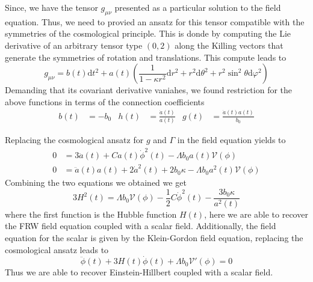 \documentclass[10pt,a4paper]{article}
\begin{document}
Since, we have the tensor $g_{\mu\nu}$ presented as a particular solution to the field equation. Thus, we need to provied
an ansatz for this tensor compatible with the symmetries of the cosmological principle. This is donde by computing the Lie derivative of an 
arbitrary tensor type $(0,2)$ along the Killing vectors that generate the symmetries of rotation and translations. This compute leads to 
\begin{equation}
  g_{\mu\nu} = b(t)\mathrm{d}t^2 + a(t)\left(\frac{1}{1 - \kappa r^2} \mathrm{d}r^2 + r^2 \mathrm{d}\theta^2 
  + r^2 \sin^2 \theta \mathrm{d} \varphi^2 \right)
\end{equation}
Demanding that its covariant derivative vaniahes, we found restriction for the above functions in terms of the connection coefficients
\begin{align}
  b(t) & = -b_0 & h(t) & = \frac{\dot{a}(t)}{a(t)} & g(t) & = \frac{\dot{a}(t)a(t)}{b_0}
\end{align}

Replacing the cosmological ansatz for $g$ and $\Gamma$ in the field equation yields to
\begin{align}
  0 & = 3\ddot{a}(t) + C a(t)\dot{\phi}^{2}(t) - \Lambda b_0 a(t)\mathcal{V}(\phi) \\
  0 & = \ddot{a}(t)a(t) + 2\dot{a}^2(t) + 2b_0\kappa - \Lambda b_0 a^2(t)\mathcal{V}(\phi)
  \end{align}
Combining the two equations we obtained we get
\begin{equation}
  3H^2(t) = \Lambda b_0 \mathcal{V}(\phi) -\frac{1}{2}C \dot{\phi}^2(t) - \frac{3b_0\kappa}{a^2(t)}
\end{equation}
where the first function is the Hubble function $H(t)$, here we are able to recover the FRW field equation coupled with a scalar field. Additionally,
the field equation for the scalar is given by the Klein-Gordon field equation, replacing the cosmological ansatz leads to
\begin{equation}
  \ddot{\phi}(t) + 3H(t)\dot{\phi}(t) + \Lambda b_0 \mathcal{V}'(\phi) = 0
\end{equation}
Thus we are able to recover Einstein-Hillbert coupled with a scalar field.
\end{document}
